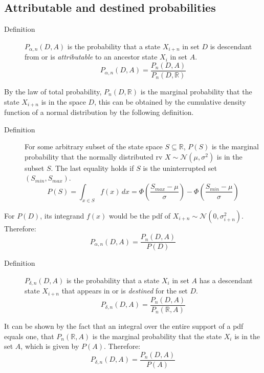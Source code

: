 \documentclass[a4paper,11pt]{article} %
\begin{document}
\subsection{Attributable and destined probabilities}

\begin{description}
\item [Definition] $P_{\alpha , n}(D, A)$ is the probability that a state $X_{i+n}$ in set $D$ is descendant from or is \emph{attributable} to an ancestor state $X_i$ in set $A$.
$$P_{\alpha , n}(D, A) = \frac{P_n(D, A)}{P_n(D, \mathbb{R})}$$
\end{description}

By the law of total probability, $P_n(D, \mathbb{R})$ is the marginal probability that the state $X_{i+n}$ is in the space $D$, this can be obtained by the cumulative density function of a normal distribution by the following definition.

\begin{description}
\item [Definition] For some arbitrary subset of the state space $S \subseteq \mathbb{R}$, $P(S)$ is the marginal probability that the normally distributed rv $X \sim \mathcal{N}(\mu, \sigma^2)$ is in the subset $S$. The last equality holds if $S$ is the uninterrupted set $(S_{min}, S_{max})$.
$$P(S) = \int_{x\in S} f(x) \, dx = \Phi(\frac{S_{max} - \mu}{\sigma}) - \Phi(\frac{S_{min} - \mu}{\sigma})$$
\end{description}

For $P(D)$, its integrand $f(x)$ would be the pdf of $X_{i+n} \sim \mathcal{N}(0, \sigma_{i+n}^2)$. Therefore:
$$P_{\alpha , n}(D, A) = \frac{P_n(D, A)}{P(D)}$$



\begin{description}
\item [Definition] $P_{\delta , n}(D, A)$ is the probability that a state $X_i$ in set $A$ has a descendant state $X_{i+n}$ that appears in or is \emph{destined} for the set $D$. 
$$P_{\delta , n}(D, A) = \frac{P_n(D, A)}{P_n(\mathbb{R}, A)}$$
\end{description}

It can be shown by the fact that an integral over the entire support of a pdf equals one, that $P_n(\mathbb{R}, A)$ is the marginal probability that the state $X_i$ is in the set $A$, which is given by $P(A)$. Therefore:
%
$$P_{\delta , n}(D, A) = \frac{P_n(D, A)}{P(A)}$$
\end{document}
